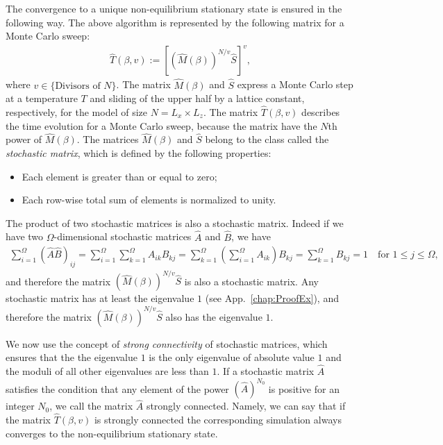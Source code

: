 The convergence to a unique non-equilibrium stationary state is ensured in the following way. The above algorithm is represented by the following matrix for a Monte Carlo sweep:
\begin{align}
\hat{T}(\beta,v):=\left[\left(\hat{M}(\beta)\right)^{N/v}\hat{S}\right]^{v},
\end{align}
where $v\in\{\text{Divisors of }N\}$. The matrix $\hat{M}(\beta)$ and $\hat{S}$ express a Monte Carlo step at a temperature $T$ and sliding of the upper half by a lattice constant, respectively, for the model of size $N=L_{x}\times L_{z}$. The matrix $\hat{T}(\beta,v)$ describes the time evolution for a Monte Carlo sweep, because the matrix have the $N$th power of $\hat{M}(\beta)$. The matrices $\hat{M}(\beta)$ and $\hat{S}$ belong to the class called the \textit{stochastic matrix}, which is defined by the following properties:
\begin{itemize}
	\item Each element is greater than or equal to zero;
	\item Each row-wise total sum of elements is normalized to unity.
\end{itemize}
The product of two stochastic matrices is also a stochastic matrix. Indeed if we have two $\Omega$-dimensional stochastic matrices $\hat{A}$ and $\hat{B}$, we have
\begin{align}
\sum_{i=1}^{\Omega}(\hat{A}\hat{B})_{ij} = \sum_{i=1}^{\Omega}\sum_{k=1}^{\Omega}A_{ik}B_{kj} = \sum_{k=1}^{\Omega}\left(\sum_{i=1}^{\Omega}A_{ik}\right)B_{kj} = \sum_{k=1}^{\Omega}B_{kj} = 1 \quad\text{for $1\leq j\leq \Omega$},
\end{align}
and therefore the matrix $\left(\hat{M}(\beta)\right)^{N/v}\hat{S}$ is also a stochastic matrix. Any stochastic matrix has at least the eigenvalue $1$ (see App.~\ref{chap:ProofEx}), and therefore the matrix $\left(\hat{M}(\beta)\right)^{N/v}\hat{S}$ also has the eigenvalue $1$.

We now use the concept of \textit{strong connectivity} of stochastic matrices, which ensures that the the eigenvalue $1$ is the only eigenvalue of absolute value $1$ and the moduli of all other eigenvalues are less than $1$. If a stochastic matrix $\hat{A}$ satisfies the condition that any element of the power $\left(\hat{A}\right)^{N_{0}}$ is positive for an integer $N_{0}$, we call the matrix $\hat{A}$ strongly connected. Namely, we can say that if the matrix $\hat{T}(\beta,v)$ is strongly connected the corresponding simulation always converges to the non-equilibrium stationary state.

